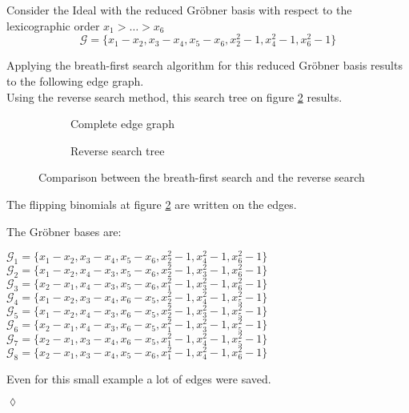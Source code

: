 \begin{env_example}\normalfont
Consider the Ideal with the reduced Gröbner basis with respect to the lexicographic order $x_{1} > \ldots > x_{6} $
\[ \mathcal{G} = \{x_{1} - x_{2}, x_{3} - x_{4}, x_{5}-x_{6} , x_{2}^{2} -1 , x_{4}^{2} - 1, x_{6}^{2} - 1 \} \]

Applying the breath-first search algorithm for this reduced Gröbner basis results to the following edge graph.\\
Using the reverse search method, this search tree on figure \ref{fig:reverse} results.


\begin{figure}[h]
    \centering
    \begin{subfigure}[b]{0.48\linewidth}        %
        \centering
        
        \caption{Complete edge graph}
        \label{fig:breadth}
    \end{subfigure}
    \begin{subfigure}[b]{0.48\linewidth}        %
        \centering
        
        \caption{Reverse search tree}
        \label{fig:reverse}
    \end{subfigure}
    \caption{Comparison between the breath-first search and the reverse search}
    \label{fig:graph}
\end{figure}
\newpage
The flipping binomials at figure \ref{fig:reverse} are written on the edges.

The Gröbner bases are:
\begin{center}
$\mathcal{G}_{1} = \{x_{1}-x_{2},x_{3}-x_{4},x_{5}-x_{6},x_{2}^{2}-1,x_{4}^{2}-1,x_{6}^{2}-1 \} $ \\
$\mathcal{G}_{2} = \{x_{1}-x_{2},x_{4}-x_{3},x_{5}-x_{6},x_{2}^{2}-1,x_{3}^{2}-1,x_{6}^{2}-1 \} $ \\
$\mathcal{G}_{3} = \{x_{2}-x_{1},x_{4}-x_{3},x_{5}-x_{6},x_{1}^{2}-1,x_{3}^{2}-1,x_{6}^{2}-1 \} $ \\
$\mathcal{G}_{4} = \{x_{1}-x_{2},x_{3}-x_{4},x_{6}-x_{5},x_{2}^{2}-1,x_{4}^{2}-1,x_{5}^{2}-1 \} $ \\
$\mathcal{G}_{5} = \{x_{1}-x_{2},x_{4}-x_{3},x_{6}-x_{5},x_{2}^{2}-1,x_{3}^{2}-1,x_{5}^{2}-1 \} $ \\
$\mathcal{G}_{6} = \{x_{2}-x_{1},x_{4}-x_{3},x_{6}-x_{5},x_{1}^{2}-1,x_{3}^{2}-1,x_{5}^{2}-1 \} $ \\
$\mathcal{G}_{7} = \{x_{2}-x_{1},x_{3}-x_{4},x_{6}-x_{5},x_{1}^{2}-1,x_{4}^{2}-1,x_{5}^{2}-1 \} $ \\
$\mathcal{G}_{8} = \{x_{2}-x_{1},x_{3}-x_{4},x_{5}-x_{6},x_{1}^{2}-1,x_{4}^{2}-1,x_{6}^{2}-1 \} $ \\
\end{center}

Even for this small example a lot of edges were saved.
\begin{flushright}
$\lozenge$
\end{flushright}
\end{env_example}




